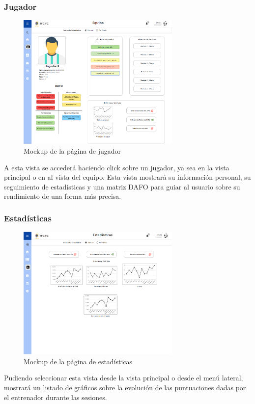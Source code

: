 \subsubsection{Jugador}
\begin{figure}[H] 
    \centering
    \includegraphics[width=8cm]{archivos/tfg_jorge/mockups/jugador}
    \caption{Mockup de la página de jugador}\label{sistemass2}
\end{figure}
A esta vista se accederá haciendo click sobre un jugador, ya sea en la vista principal o en al vista del equipo. Esta vista mostrará su información personal, su seguimiento de estadísticas y una matriz DAFO para guiar al usuario sobre su rendimiento de una forma más precisa.
\subsubsection{Estadísticas}
\begin{figure}[H] 
    \centering
    \includegraphics[width=8cm]{archivos/tfg_jorge/mockups/stats}
    \caption{Mockup de la página de estadísticas}\label{sistemass2}
\end{figure}
Pudiendo seleccionar esta vista desde la vista principal o desde el menú lateral, mostrará un listado de gráficos sobre la evolución de las puntuaciones dadas por el entrenador durante las sesiones.
